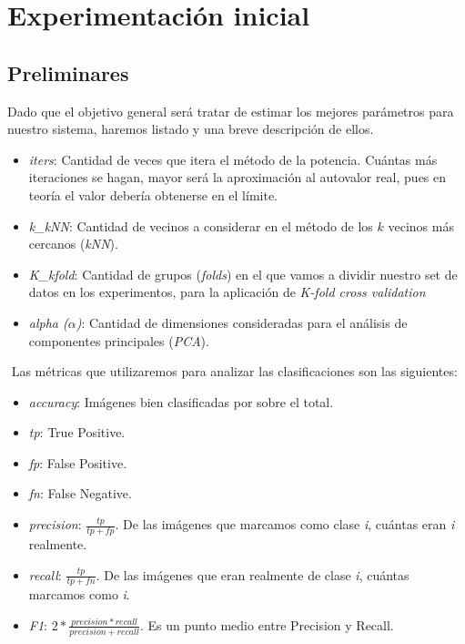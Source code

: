 \section{Experimentación inicial}

\subsection{Preliminares}

Dado que el objetivo general será tratar de estimar los mejores parámetros para nuestro sistema, haremos listado y una breve descripción de ellos.

\begin{itemize}
\item \textit{iters}: Cantidad de veces que itera el método de la potencia. Cuántas más iteraciones se hagan, mayor será la aproximación al autovalor real, pues en teoría el valor debería obtenerse en el límite.

\item \textit{k\_kNN}: Cantidad de vecinos a considerar en el método de los $k$ vecinos más cercanos (\textit{kNN}).

\item \textit{K\_kfold}: Cantidad de grupos (\textit{folds}) en el que vamos a dividir nuestro set de datos en los experimentos, para la aplicación de \textit{K-fold cross validation}

\item \textit{alpha ($\alpha$)}: Cantidad de dimensiones consideradas para el análisis de componentes principales (\textit{PCA}).

\end{itemize}
$ $\newline
Las métricas que utilizaremos para analizar las clasificaciones son las siguientes:

\begin{itemize}

    \item \textit{accuracy}: Imágenes bien clasificadas por sobre el total.

    \item \textit{tp}: True Positive.

    \item \textit{fp}: False Positive.

    \item \textit{fn}: False Negative.

    \item \textit{precision}: $\frac{tp}{tp + fp}$. De las imágenes que marcamos como clase \textit{i}, cuántas eran \textit{i} realmente.

    \item \textit{recall}:  $\frac{tp}{tp + fn}$. De las imágenes que eran realmente de clase \textit{i}, cuántas marcamos como \textit{i}.

    \item \textit{F1}: $2 * \frac{precision * recall}{precision + recall}$. Es un punto medio entre Precision y Recall.

\end{itemize}



